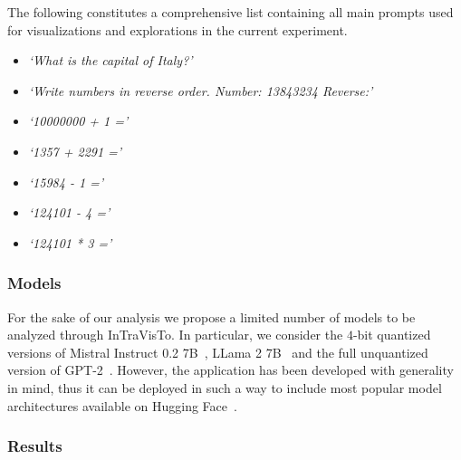 The following constitutes a comprehensive list containing all main prompts used for visualizations and explorations in the current experiment.

\begin{multicols}{2}
    \begin{itemize}
        \item \emph{`What is the capital of Italy?'}
        \item \emph{`Write numbers in reverse order. Number: 13843234 Reverse:'}
        \item \emph{`10000000 + 1 ='}
        \item \emph{`1357 + 2291 ='}
        \item \emph{`15984 - 1 ='}
        \item \emph{`124101 - 4 ='}
        \item \emph{`124101 * 3 ='}
    \end{itemize}
\end{multicols}

\subsubsection{Models}

For the sake of our analysis we propose a limited number of models to be analyzed through InTraVisTo.
In particular, we consider the $4$-bit quantized versions of Mistral Instruct 0.2 7B~\cite{jiang2023}, LLama 2 7B~\cite{touvron2023} and the full unquantized version of GPT-2~\cite{radford2019}.
However, the application has been developed with generality in mind, thus it can be deployed in such a way to include most popular model architectures available on Hugging Face~\cite{wolf2020}.


\subsubsection{Results}

